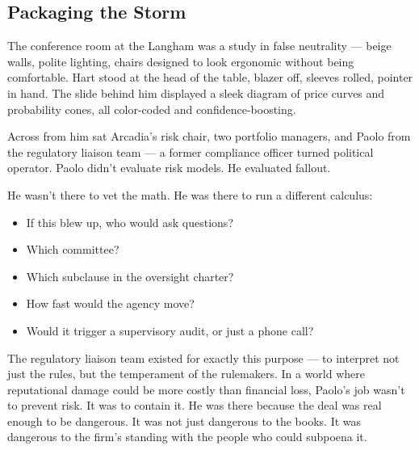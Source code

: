 \subsection{Packaging the Storm}

The conference room at the Langham was a study in false neutrality — beige walls, polite lighting, chairs designed to look ergonomic without being comfortable.  
Hart stood at the head of the table, blazer off, sleeves rolled, pointer in hand. The slide behind him displayed a sleek diagram of price curves and probability cones, all color-coded and confidence-boosting.

Across from him sat Arcadia’s risk chair, two portfolio managers, and Paolo from the regulatory liaison team — a former 
compliance officer turned political operator. Paolo didn’t evaluate risk models. He evaluated fallout.

He wasn’t there to vet the math. He was there to run a different calculus:

\begin{itemize}
  \item If this blew up, who would ask questions?
  \item Which committee?
  \item Which subclause in the oversight charter?
  \item How fast would the agency move?
  \item Would it trigger a supervisory audit, or just a phone call?
\end{itemize}

The regulatory liaison team existed for exactly this purpose — to interpret not just the rules, but the temperament of the 
rulemakers.
In a world where reputational damage could be more costly than financial loss, Paolo’s job wasn’t to prevent risk. It was to 
contain it.
He was there because the deal was real enough to be dangerous. It was not just dangerous to the books. It was dangerous to the firm’s 
standing with the people who could subpoena it.

\medskip

